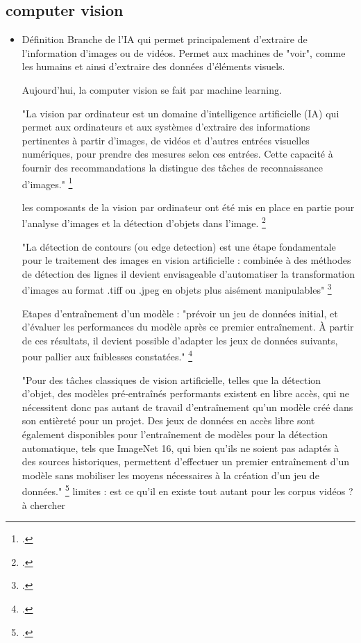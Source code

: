 \subsection{computer vision}

\begin{itemize}

\item Définition
Branche de l'IA qui permet principalement d'extraire de l'information d'images ou de vidéos.
Permet aux machines de "voir", comme les humains et ainsi d'extraire des données d'éléments visuels.

Aujourd'hui, la computer vision se fait par machine learning.

	
"La vision par ordinateur est un domaine d’intelligence artificielle (IA) qui permet aux ordinateurs et aux systèmes d’extraire des informations pertinentes à partir d’images, de vidéos et d’autres entrées visuelles numériques, pour prendre des mesures selon ces entrées. Cette capacité à fournir des recommandations la distingue des tâches de reconnaissance d’images." \footcite{2021c}

les composants de la vision par ordinateur ont été mis en place en partie pour l'analyse d'images et la détection d'objets dans l'image. \footcite{norindr2023}

"La détection de contours (ou edge detection) est une étape fondamentale pour le traitement	des images en vision artificielle : combinée à des méthodes de détection des lignes il devient envisageable d’automatiser la transformation d’images au format .tiff ou .jpeg en	objets plus aisément manipulables" \footcite{norindr2023}

Etapes d'entraînement d'un modèle : "prévoir un jeu de données initial, et d’évaluer les performances du modèle après ce premier entraînement. À partir	de ces résultats, il devient possible d’adapter les jeux de données suivants, pour pallier	aux faiblesses constatées." \footcite{norindr2023}

"Pour des tâches classiques de vision artificielle, telles que la détection d’objet, des	modèles pré-entraînés performants existent en libre accès, qui ne nécessitent donc pas	autant de travail d’entraînement qu’un modèle créé dans son entièreté pour un projet.
Des jeux de données en accès libre sont également disponibles pour l’entraînement de	modèles pour la détection automatique, tels que ImageNet 16, qui bien qu’ils ne soient	pas adaptés à des sources historiques, permettent d’effectuer un premier entraînement	d’un modèle sans mobiliser les moyens nécessaires à la création d’un jeu de données." \footcite{norindr2023}
limites : est ce qu'il en existe tout autant pour les corpus vidéos ? à chercher


\end{itemize}
